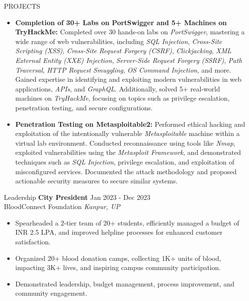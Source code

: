 \documentclass{resume} %
\begin{document}
\begin{rSection}{PROJECTS}
\begin{itemize}
    \item \textbf{Completion of 30+ Labs on PortSwigger and 5+ Machines on TryHackMe:} {Completed over 30 hands-on labs on \textit{PortSwigger}, mastering a wide range of web vulnerabilities, including \textit{SQL Injection}, \textit{Cross-Site Scripting (XSS)}, \textit{Cross-Site Request Forgery (CSRF)}, \textit{Clickjacking}, \textit{XML External Entity (XXE) Injection}, \textit{Server-Side Request Forgery (SSRF)}, \textit{Path Traversal}, \textit{HTTP Request Smuggling}, \textit{OS Command Injection}, and more. Gained expertise in identifying and exploiting modern vulnerabilities in web applications, \textit{APIs}, and \textit{GraphQL}. Additionally, solved 5+ real-world machines on \textit{TryHackMe}, focusing on topics such as privilege escalation, penetration testing, and secure configurations.}
    \item \textbf{Penetration Testing on Metasploitable2:} {Performed ethical hacking and exploitation of the intentionally vulnerable \textit{Metasploitable} machine within a virtual lab environment. Conducted reconnaissance using tools like \textit{Nmap}, exploited vulnerabilities using the \textit{Metasploit Framework}, and demonstrated techniques such as \textit{SQL Injection}, privilege escalation, and exploitation of misconfigured services. Documented the attack methodology and proposed actionable security measures to secure similar systems.}
\end{itemize}
\end{rSection}



\begin{rSection}{Leadership}
\textbf{City President} \hfill Jan 2023 - Dec 2023\\
BloodConnect Foundation \hfill \textit{Kanpur, UP}
\begin{itemize}[noitemsep]
    \item Spearheaded a 2-tier team of 20+ students, efficiently managed a budget of INR 2.5 LPA, and improved helpline processes for enhanced customer satisfaction.
    \item Organized 20+ blood donation camps, collecting 1K+ units of blood, impacting 3K+ lives, and inspiring campus community participation.
    \item Demonstrated leadership, budget management, process improvement, and community engagement.
\end{itemize}
\end{rSection}
\end{document}

